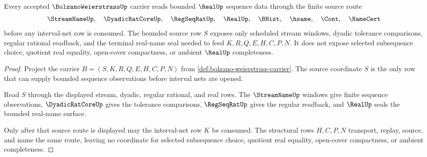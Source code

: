 \begin{theorem}
\label{thm:bolzano-weierstrass-bounded-sequence-source}
Every accepted $\BolzanoWeierstrassUp$ carrier reads bounded $\RealUp$ sequence data through the finite source route
$$
\StreamNameUp,\quad \DyadicRatCoreUp,\quad \RegSeqRatUp,\quad \RealUp,\quad \BHist,\quad \hsame,\quad \Cont,\quad \NameCert
$$
before any interval-net row is consumed. The bounded source row $S$ exposes only scheduled stream windows, dyadic tolerance comparisons, regular rational readback, and the terminal real-name seal needed to feed $K,R,Q,E,H,C,P,N$. It does not expose selected subsequence choice, quotient real equality, open-cover compactness, or ambient $\RealUp$ completeness.
\end{theorem}
\begin{proof}
Project the carrier $B=(S,K,R,Q,E,H,C,P,N)$ from \autoref{def:bolzano-weierstrass-carrier}. The source coordinate $S$ is the only row that can supply bounded sequence observations before interval nets are opened.

Read $S$ through the displayed stream, dyadic, regular rational, and real rows. The $\StreamNameUp$ windows give finite sequence observations, $\DyadicRatCoreUp$ gives the tolerance comparisons, $\RegSeqRatUp$ gives the regular readback, and $\RealUp$ seals the bounded real-name surface.

Only after that source route is displayed may the interval-net row $K$ be consumed. The structural rows $H,C,P,N$ transport, replay, source, and name the same route, leaving no coordinate for selected subsequence choice, quotient real equality, open-cover compactness, or ambient completeness.
\end{proof}

